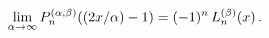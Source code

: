 \[\lim_{\alpha\to\infty}\mathop{P^{(\alpha,\beta)}_{n}\/}\nolimits\!\left((2x/%
\alpha)-1\right)=(-1)^{n}\mathop{L^{(\beta)}_{n}\/}\nolimits\!\left(x\right).\]